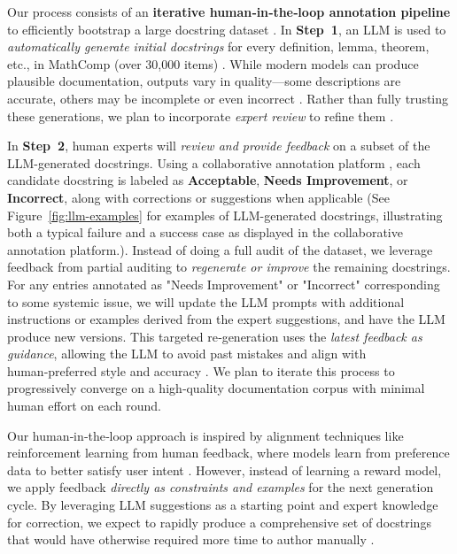 \documentclass[11pt,a4paper]{article}
\begin{document}
Our process consists of an \textbf{iterative human‑in‑the‑loop annotation pipeline} to efficiently bootstrap a large docstring dataset \cite{labelstudio_github}. In \textbf{Step~1}, an LLM is used to \emph{automatically generate initial docstrings} for every definition, lemma, theorem, etc., in MathComp (over 30,000 items) \cite{chakrabarty2024codedoc}. While modern models can produce plausible documentation, outputs vary in quality—some descriptions are accurate, others may be incomplete or even incorrect \cite{dvivedi2023comparative}. Rather than fully trusting these generations, we plan to incorporate \emph{expert review} to refine them \cite{ouyang2022rlhf}.

In \textbf{Step~2}, human experts will \emph{review and provide feedback} on a subset of the LLM-generated docstrings. Using a collaborative annotation platform \cite{labelstudio_github}, each candidate docstring is labeled as \textbf{Acceptable}, \textbf{Needs Improvement}, or \textbf{Incorrect}, along with corrections or suggestions when applicable (See Figure~\ref{fig:llm-examples} for examples of LLM-generated docstrings, illustrating both a typical failure and a success case as displayed in the collaborative annotation platform.). Instead of doing a full audit of the dataset, we leverage feedback from partial auditing to \emph{regenerate or improve} the remaining docstrings. For any entries annotated as "Needs Improvement" or "Incorrect" corresponding to some systemic issue, we will update the LLM prompts with additional instructions or examples derived from the expert suggestions, and have the LLM produce new versions. This targeted re‑generation uses the \emph{latest feedback as guidance}, allowing the LLM to avoid past mistakes and align with human‑preferred style and accuracy \cite{ouyang2022rlhf}. We plan to iterate this process to progressively converge on a high‑quality documentation corpus with minimal human effort on each round.

Our human‑in‑the‑loop approach is inspired by alignment techniques like reinforcement learning from human feedback, where models learn from preference data to better satisfy user intent \cite{ouyang2022rlhf}. However, instead of learning a reward model, we apply feedback \emph{directly as constraints and examples} for the next generation cycle. By leveraging LLM suggestions as a starting point and expert knowledge for correction, we expect to rapidly produce a comprehensive set of docstrings that would have otherwise required more time to author manually \cite{dvivedi2023comparative}.
\end{document}
